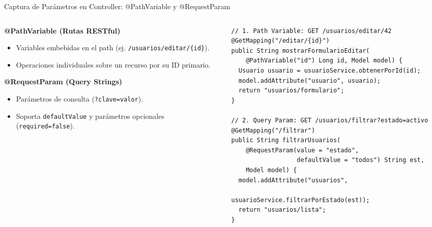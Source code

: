 \documentclass[aspectratio=169]{beamer}
\begin{document}
\begin{frame}[fragile]{Captura de Par\'ametros en Controller: @PathVariable y @RequestParam}
\begin{columns}[c]
\begin{column}{0.48\textwidth}
  \textbf{@PathVariable (Rutas RESTful)}
  \begin{itemize}
    \item Variables embebidas en el path (ej. \texttt{/usuarios/editar/\{id\}}).
    \item Operaciones individuales sobre un recurso por su ID primario.
  \end{itemize}
  \vspace{3pt}
  \textbf{@RequestParam (Query Strings)}
  \begin{itemize}
    \item Par\'ametros de consulta (\texttt{?clave=valor}).
    \item Soporta \texttt{defaultValue} y par\'ametros opcionales (\texttt{required=false}).
  \end{itemize}
\end{column}
\begin{column}{0.50\textwidth}
\begin{lstlisting}[style=SpringCodeStyle]
// 1. Path Variable: GET /usuarios/editar/42
@GetMapping("/editar/{id}")
public String mostrarFormularioEditar(
    @PathVariable("id") Long id, Model model) {
  Usuario usuario = usuarioService.obtenerPorId(id);
  model.addAttribute("usuario", usuario);
  return "usuarios/formulario";
}

// 2. Query Param: GET /usuarios/filtrar?estado=activo
@GetMapping("/filtrar")
public String filtrarUsuarios(
    @RequestParam(value = "estado", 
                  defaultValue = "todos") String est,
    Model model) {
  model.addAttribute("usuarios", 
                     usuarioService.filtrarPorEstado(est));
  return "usuarios/lista";
}
\end{lstlisting}
\end{column}
\end{columns}
\end{frame}
\end{document}

